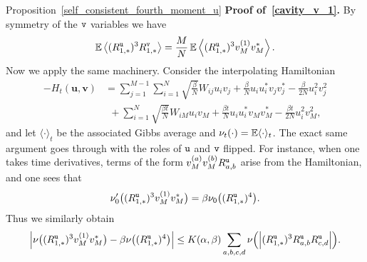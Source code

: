 \documentclass[final,12pt]{colt2018} %
\newcommand{\utt}{\textup{\texttt{u}}}
\newcommand{\vtt}{\textup{\texttt{v}}}
\renewcommand{\u}{\bm{u}}
\renewcommand{\v}{\bm{v}}
\begin{document}
\begin{proofof}{Proposition~\ref{self_consistent_fourth_moment_u}}
\noindent\textbf{Proof of~\eqref{cavity_v_1}.} By symmetry of the $\vtt$ variables we have
\[\E\left\langle(R^{\utt}_{1,*})^3R^{\vtt}_{1,*}\right\rangle = \frac{M}{N}\E\left\langle(R^{\utt}_{1,*})^3v_M^{(1)}v_M^{*}\right\rangle.\]
Now we apply the same machinery. Consider the interpolating Hamiltonian 
\begin{align*}
-H_t(\u,\v) &= \sum_{j=1}^{ M-1} \sum_{i=1}^N \sqrt{\frac{\beta}{N}}W_{ij}u_i v_j + \frac{\beta}{N}u_iu_i^*v_jv_j^*- \frac{\beta}{2N}u_i^2v_j^2 \\
&~~+  \sum_{i=1}^N \sqrt{\frac{\beta t}{N}}W_{iM}u_i v_M + \frac{\beta t}{N}u_iu_i^*v_Mv_M^*- \frac{\beta t}{2N}u_i^2v_M^2,
\end{align*}
and let $\langle \cdot \rangle_t$ be the associated Gibbs average and $\nu_t(\cdot) = \operatorname{\mathbb{E}}\langle \cdot \rangle_t$. The exact same argument goes through with the roles of $\utt$ and $\vtt$ flipped. For instance, when one takes time derivatives, terms of the form $v_M^{(a)}v_M^{(b)}R^{\utt}_{a,b}$ arise from the Hamiltonian, and one sees that 
\[\nu_0'\big((R^{\utt}_{1,*})^3v_M^{(1)}v_M^{*}\big) = \beta\nu_0\big((R^{\utt}_{1,*})^4\big).\]
 Thus we similarly obtain
\[\abs{\nu\big((R^{\utt}_{1,*})^3v_M^{(1)}v_M^{*}\big) - \beta \nu\big((R^{\utt}_{1,*})^4\big)} \le K(\alpha,\beta)\sum_{a,b,c,d} \nu\Big(\Big|(R^{\utt}_{1,*})^3R^{\utt}_{a,b}R^{\utt}_{c,d}\Big|\Big).\]  
\end{proofof}
\end{document}
